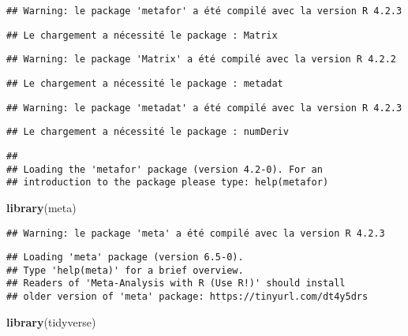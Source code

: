 \documentclass[
]{article}
\newenvironment{Shaded}{\begin{snugshade}}{\end{snugshade}}
\newcommand{\FunctionTok}[1]{\textcolor[rgb]{0.13,0.29,0.53}{\textbf{#1}}}
\newcommand{\NormalTok}[1]{#1}
\begin{document}
\begin{verbatim}
## Warning: le package 'metafor' a été compilé avec la version R 4.2.3
\end{verbatim}

\begin{verbatim}
## Le chargement a nécessité le package : Matrix
\end{verbatim}

\begin{verbatim}
## Warning: le package 'Matrix' a été compilé avec la version R 4.2.2
\end{verbatim}

\begin{verbatim}
## Le chargement a nécessité le package : metadat
\end{verbatim}

\begin{verbatim}
## Warning: le package 'metadat' a été compilé avec la version R 4.2.3
\end{verbatim}

\begin{verbatim}
## Le chargement a nécessité le package : numDeriv
\end{verbatim}

\begin{verbatim}
## 
## Loading the 'metafor' package (version 4.2-0). For an
## introduction to the package please type: help(metafor)
\end{verbatim}

\begin{Shaded}
\begin{Highlighting}[]
\FunctionTok{library}\NormalTok{(meta)}
\end{Highlighting}
\end{Shaded}

\begin{verbatim}
## Warning: le package 'meta' a été compilé avec la version R 4.2.3
\end{verbatim}

\begin{verbatim}
## Loading 'meta' package (version 6.5-0).
## Type 'help(meta)' for a brief overview.
## Readers of 'Meta-Analysis with R (Use R!)' should install
## older version of 'meta' package: https://tinyurl.com/dt4y5drs
\end{verbatim}

\begin{Shaded}
\begin{Highlighting}[]
\FunctionTok{library}\NormalTok{(tidyverse)}
\end{Highlighting}
\end{Shaded}
\end{document}
